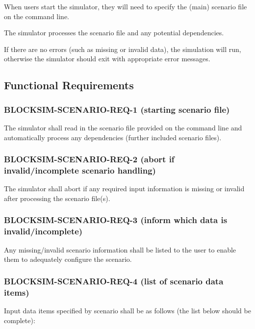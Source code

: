 \documentclass{scrreprt}
\begin{document}
      When users start the simulator, they will need to specify the (main)
      scenario file on the command line.

      The simulator processes the scenario file and any potential dependencies.

      If there are no errors (such as missing or invalid data), the simulation
      will run, otherwise the simulator should exit with appropriate error
      messages.

    \subsection{Functional Requirements}

      \subsubsection{BLOCKSIM-SCENARIO-REQ-1 (starting scenario file)}

        The simulator shall read in the scenario file provided on the command
        line and automatically process any dependencies (further included scenario
        files).

      \subsubsection{BLOCKSIM-SCENARIO-REQ-2 (abort if invalid/incomplete scenario handling)}

        The simulator shall abort if any required input information is missing
        or invalid after processing the scenario file(s).

      \subsubsection{BLOCKSIM-SCENARIO-REQ-3 (inform which data is invalid/incomplete)}

        Any missing/invalid scenario information shall be listed to the user to
        enable
        them to adequately configure the scenario.

      \subsubsection{BLOCKSIM-SCENARIO-REQ-4 (list of scenario data items)}

        Input data items specified by scenario shall be as follows
        (the list below should be complete):
\end{document}
